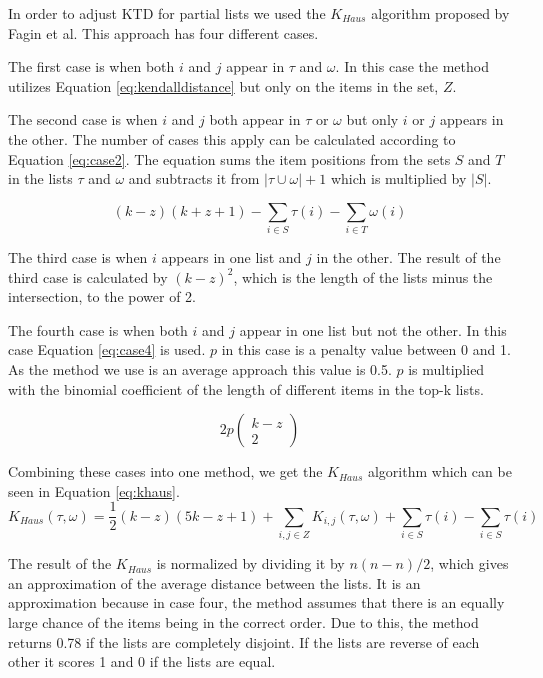 In order to adjust KTD for partial lists we used the $K_{Haus}$ algorithm proposed by Fagin et al\cite{comparing:topk}. This approach has four different cases.

The first case is when both $i$ and $j$ appear in $\tau$ and $\omega$. In this case the method utilizes Equation \ref{eq:kendalldistance} but only on the items in the set, $Z$.

The second case is when $i$ and $j$ both appear in $\tau$ or $\omega$ but only $i$ or $j$ appears in the other. The number of cases this apply can be calculated according to Equation \ref{eq:case2}. The equation sums the item positions from the sets $S$ and $T$ in the lists $\tau$ and $\omega$ and subtracts it from $|\tau \cup \omega| + 1$ which is multiplied by $|S|$.

\begin{equation}\label{eq:case2}
(k-z)(k+z+1)- \sum_{i \in S} \tau(i)- \sum_{i \in T} \omega(i)
\end{equation}

The third case is when $i$ appears in one list and $j$ in the other. The result of the third case is calculated by $(k-z)^2$, which is the length of the lists minus the intersection, to the power of 2.

The fourth case is when both $i$ and $j$ appear in one list but not the other. In this case Equation \ref{eq:case4} is used. $p$ in this case is a penalty value between 0 and 1. As the method we use is an average approach this value is 0.5. $p$ is multiplied with the binomial coefficient of the length of different items in the top-k lists.

\begin{equation}\label{eq:case4}
2p\left(\!
    \begin{array}{c}
      k-z \\
      2
    \end{array}
  \!\right)
\end{equation}


Combining these cases into one method, we get the $K_{Haus}$ algorithm which can be seen in Equation \ref{eq:khaus}. 
\footnotesize
\begin{equation}\label{eq:khaus}
K_{Haus}(\tau,\omega) = \frac{1}{2}(k-z)(5k-z+1)+ \sum_{i,j \in Z} K_{i,j}(\tau,\omega) + \sum_{i \in S}\tau(i) - \sum_{i \in S}\tau(i)
\end{equation}
\normalsize

The result of the $K_{Haus}$ is normalized by dividing it by $n(n-n)/2$, which gives an approximation of the average distance between the lists. It is an approximation because in case four, the method assumes that there is an equally large chance of the items being in the correct order. Due to this, the method returns 0.78 if the lists are completely disjoint. If the lists are reverse of each other it scores 1 and 0 if the lists are equal. %


